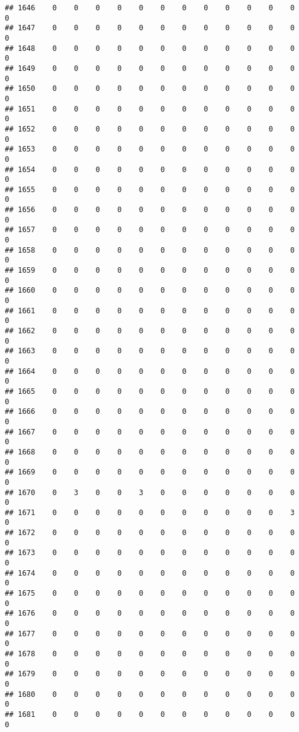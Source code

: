 \documentclass[]{article}
\begin{document}
\begin{verbatim}
## 1646    0    0    0    0    0    0    0    0    0    0    0    0    0
## 1647    0    0    0    0    0    0    0    0    0    0    0    0    0
## 1648    0    0    0    0    0    0    0    0    0    0    0    0    0
## 1649    0    0    0    0    0    0    0    0    0    0    0    0    0
## 1650    0    0    0    0    0    0    0    0    0    0    0    0    0
## 1651    0    0    0    0    0    0    0    0    0    0    0    0    0
## 1652    0    0    0    0    0    0    0    0    0    0    0    0    0
## 1653    0    0    0    0    0    0    0    0    0    0    0    0    0
## 1654    0    0    0    0    0    0    0    0    0    0    0    0    0
## 1655    0    0    0    0    0    0    0    0    0    0    0    0    0
## 1656    0    0    0    0    0    0    0    0    0    0    0    0    0
## 1657    0    0    0    0    0    0    0    0    0    0    0    0    0
## 1658    0    0    0    0    0    0    0    0    0    0    0    0    0
## 1659    0    0    0    0    0    0    0    0    0    0    0    0    0
## 1660    0    0    0    0    0    0    0    0    0    0    0    0    0
## 1661    0    0    0    0    0    0    0    0    0    0    0    0    0
## 1662    0    0    0    0    0    0    0    0    0    0    0    0    0
## 1663    0    0    0    0    0    0    0    0    0    0    0    0    0
## 1664    0    0    0    0    0    0    0    0    0    0    0    0    0
## 1665    0    0    0    0    0    0    0    0    0    0    0    0    0
## 1666    0    0    0    0    0    0    0    0    0    0    0    0    0
## 1667    0    0    0    0    0    0    0    0    0    0    0    0    0
## 1668    0    0    0    0    0    0    0    0    0    0    0    0    0
## 1669    0    0    0    0    0    0    0    0    0    0    0    0    0
## 1670    0    3    0    0    3    0    0    0    0    0    0    0    0
## 1671    0    0    0    0    0    0    0    0    0    0    0    3    0
## 1672    0    0    0    0    0    0    0    0    0    0    0    0    0
## 1673    0    0    0    0    0    0    0    0    0    0    0    0    0
## 1674    0    0    0    0    0    0    0    0    0    0    0    0    0
## 1675    0    0    0    0    0    0    0    0    0    0    0    0    0
## 1676    0    0    0    0    0    0    0    0    0    0    0    0    0
## 1677    0    0    0    0    0    0    0    0    0    0    0    0    0
## 1678    0    0    0    0    0    0    0    0    0    0    0    0    0
## 1679    0    0    0    0    0    0    0    0    0    0    0    0    0
## 1680    0    0    0    0    0    0    0    0    0    0    0    0    0
## 1681    0    0    0    0    0    0    0    0    0    0    0    0    0

\end{verbatim}
\end{document}
